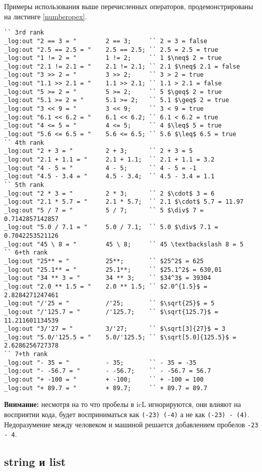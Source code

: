 \documentclass[a4paper, 14pt]{extarticle}
\begin{document}
	Примеры использования выше перечисленных операторов, продемонстрированы на листинге \ref{numberopex}.
	
\begin{lstlisting}[caption=Примеры использования операторов над данными типа int и double, label=numberopex]
`` 3rd rank
_log:out "2 == 3 = "		2 == 3;		`` 2 = 3 = false
_log:out "2.5 == 2.5 = "	2.5 == 2.5;	`` 2.5 = 2.5 = true
_log:out "1 != 2 = "		1 != 2;		`` 1 $\neq$ 2 = true
_log:out "2.1 != 2.1 = "	2.1 != 2.1;	`` 2.1 $\neq$ 2.1 = false
_log:out "3 >> 2 = "		3 >> 2;		`` 3 > 2 = true
_log:out "1.1 >> 2.1 = "	1.1 >> 2.1;	`` 1.1 > 2.1 = false
_log:out "5 >= 2 = "		5 >= 2;		`` 5 $\geq$ 2 = true
_log:out "5.1 >= 2 = "		5.1 >= 2;	`` 5.1 $\geq$ 2 = true
_log:out "3 << 9 = "		3 << 9;		`` 3 < 9 = true
_log:out "6.1 << 6.2 = "	6.1 << 6.2;	`` 6.1 < 6.2 = true
_log:out "4 <= 5 = "		4 <= 5;		`` 4 $\leq$ 5 = true
_log:out "5.6 <= 6.5 = "	5.6 <= 6.5;	`` 5.6 $\leq$ 6.5 = true
`` 4th rank
_log:out "2 + 3 = "			2 + 3;		`` 2 + 3 = 5
_log:out "2.1 + 1.1 = "		2.1 + 1.1;	`` 2.1 + 1.1 = 3.2
_log:out "4 - 5 = "			4 - 5;		`` 4 - 5 = -1
_log:out "4.5 - 3.4 = "		4.5 - 3.4;	`` 4.5 - 3.4 = 1.1
`` 5th rank
_log:out "2 * 3 = "			2 * 3;		`` 2 $\cdot$ 3 = 6
_log:out "2.1 * 5.7 = "		2.1 * 5.7;	`` 2.1 $\cdot$ 5.7 = 11.97
_log:out "5 / 7 = "			5 / 7;		`` 5 $\div$ 7 = 0.7142857142857
_log:out "5.0 / 7.1 = "		5.0 / 7.1;	`` 5.0 $\div$ 7.1 = 0.7042253521126
_log:out "45 \ 8 = "		45 \ 8;		`` 45 \textbackslash 8 = 5
`` 6+th rank
_log:out "25** = "			25**;		`` $25^2$ = 625
_log:out "25.1** = "		25.1**;		`` $25.1^2$ = 630,01
_log:out "34 ** 3 = "		34 ** 3;	`` $34^3$ = 39304
_log:out "2.0 ** 1.5 = "	2.0 ** 1.5;	`` $2.0^{1.5}$ = 2.8284271247461
_log:out "/'25 = "			/'25;		`` $\sqrt{25}$ = 5
_log:out "/'125.7 = "		/'125.7;	`` $\sqrt{125.7}$ = 11.211601134539
_log:out "3/'27 = "			3/'27;		`` $\sqrt[3]{27}$ = 3
_log:out "5.0/'125.5 = "	5.0/'125.5;	`` $\sqrt[5.0]{125.5}$ = 2.6286256727378
`` 7+th rank
_log:out "- 35 = "			- 35;		`` - 35 = -35
_log:out "- -56.7 = "		- -56.7;	`` - -56.7 = 56.7
_log:out "+ -100 = "		+ -100;		`` + -100 = 100
_log:out "+ 89.7 = "		+ 89.7;		`` + 89.7 = 89.7
\end{lstlisting}

	{\bf Внимание:} несмотря на то что пробелы в icL игнорируются, они влияют на восприятии кода,  будет восприниматься как \lstinline`(-23) (-4)` а не как \lstinline`(-23) - (4)`. Недоразумение между человеком и машиной решается добавлением пробелов \lstinline`-23  - 4`.

\subsection{{\color{bluemarin}string} и {\color{bluemarin}list}}
\end{document}
